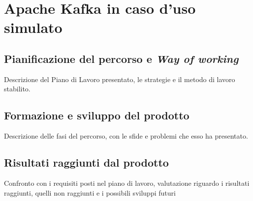 \chapter{Apache Kafka in caso d’uso simulato}

\section{Pianificazione del percorso e \textit{Way of working}}

Descrizione del Piano di Lavoro presentato, le strategie e il metodo di lavoro stabilito.

\section{Formazione e sviluppo del prodotto}

Descrizione delle fasi del percorso, con le sfide e problemi che esso ha presentato.

\section{Risultati raggiunti dal prodotto}

Confronto con i requisiti posti nel piano di lavoro, valutazione riguardo i risultati raggiunti, quelli non raggiunti e i possibili sviluppi futuri
